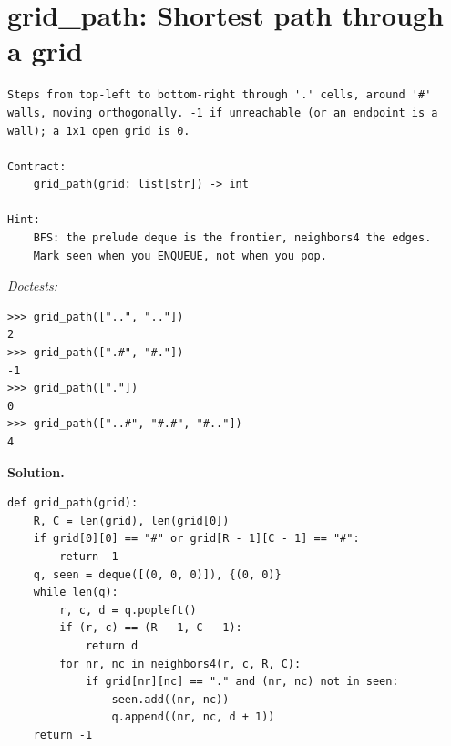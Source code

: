 \documentclass[11pt,letterpaper]{book}
\begin{document}
\section{grid\_path: Shortest path through a grid}
\begin{lstlisting}[style=spec]
Steps from top-left to bottom-right through '.' cells, around '#'
walls, moving orthogonally. -1 if unreachable (or an endpoint is a
wall); a 1x1 open grid is 0.

Contract:
    grid_path(grid: list[str]) -> int

Hint:
    BFS: the prelude deque is the frontier, neighbors4 the edges.
    Mark seen when you ENQUEUE, not when you pop.
\end{lstlisting}
\noindent\textit{Doctests:}
\begin{lstlisting}[style=spec]
>>> grid_path(["..", ".."])
2
>>> grid_path([".#", "#."])
-1
>>> grid_path(["."])
0
>>> grid_path(["..#", "#.#", "#.."])
4
\end{lstlisting}
\noindent\textbf{Solution.}
\begin{lstlisting}[style=code]
def grid_path(grid):
    R, C = len(grid), len(grid[0])
    if grid[0][0] == "#" or grid[R - 1][C - 1] == "#":
        return -1
    q, seen = deque([(0, 0, 0)]), {(0, 0)}
    while len(q):
        r, c, d = q.popleft()
        if (r, c) == (R - 1, C - 1):
            return d
        for nr, nc in neighbors4(r, c, R, C):
            if grid[nr][nc] == "." and (nr, nc) not in seen:
                seen.add((nr, nc))
                q.append((nr, nc, d + 1))
    return -1
\end{lstlisting}
\end{document}
